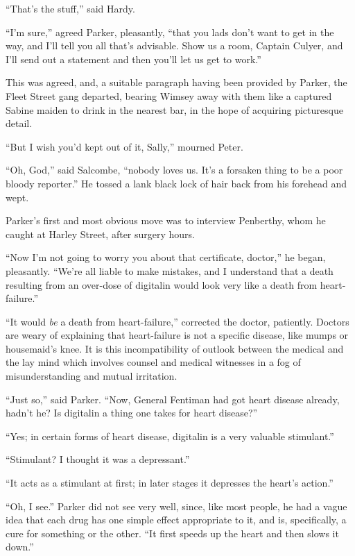 \enquote{That's the stuff,} said Hardy.

\enquote{I'm sure,} agreed Parker, pleasantly, \enquote{that you lads don't want to get in the way, and I'll tell you all that's advisable. Show us a room, Captain Culyer, and I'll send out a statement and then you'll let us get to work.}

This was agreed, and, a suitable paragraph having been provided by Parker, the Fleet Street gang departed, bearing Wimsey away with them like a captured Sabine maiden to drink in the nearest bar, in the hope of acquiring picturesque detail.

\enquote{But I wish you'd kept out of it, Sally,} mourned Peter.

\enquote{Oh, God,} said Salcombe, \enquote{nobody loves us. It's a forsaken thing to be a poor bloody reporter.} He tossed a lank black lock of hair back from his forehead and wept.

Parker's first and most obvious move was to interview Penberthy, whom he caught at Harley Street, after surgery hours.

\enquote{Now I'm not going to worry you about that certificate, doctor,} he began, pleasantly. \enquote{We're all liable to make mistakes, and I understand that a death resulting from an over-dose of digitalin would look very like a death from heart-failure.}

\enquote{It would \textit{be} a death from heart-failure,} corrected the doctor, patiently. Doctors are weary of explaining that heart-failure is not a specific disease, like mumps or housemaid's knee. It is this incompatibility of outlook between the medical and the lay mind which involves counsel and medical witnesses in a fog of misunderstanding and mutual irritation.

\enquote{Just so,} said Parker. \enquote{Now, General Fentiman had got heart disease already, hadn't he? Is digitalin a thing one takes for heart disease?}

\enquote{Yes; in certain forms of heart disease, digitalin is a very valuable stimulant.}

\enquote{Stimulant? I thought it was a depressant.}

\enquote{It acts as a stimulant at first; in later stages it depresses the heart's action.}

\enquote{Oh, I see.} Parker did not see very well, since, like most people, he had a vague idea that each drug has one simple effect appropriate to it, and is, specifically, a cure for something or the other. \enquote{It first speeds up the heart and then slows it down.}


